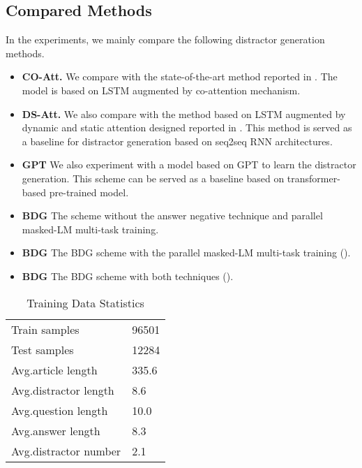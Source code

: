 \documentclass[11pt,a4paper]{article}
\begin{document}
\subsection{Compared Methods}
In the experiments, we mainly compare the following distractor generation methods. 
\begin{itemize}
     
    \item \textbf{CO-Att.} We compare with the state-of-the-art method reported in \cite{zhou2019coattention}. The model is based on LSTM augmented by co-attention mechanism. 
    \item \textbf{DS-Att.} We also compare with the method based on LSTM augmented by dynamic and static attention designed reported in \cite{gao2019generating}. This method is served as a baseline for distractor generation based on seq2seq RNN architectures. 
    \item \textbf{GPT} We also experiment with a model based on GPT \cite{radford2018improving} to learn the distractor generation. This scheme can be served as a baseline based on transformer-based pre-trained model. 
    \item \textbf{BDG} The scheme without the answer negative technique and parallel masked-LM multi-task training.
\item \textbf{BDG} The BDG scheme with the parallel masked-LM multi-task training ().
    \item \textbf{BDG} The BDG scheme with both techniques ().
\end{itemize}


\begin{table}
  \centering
  \begin{tabular}{ll}
    \midrule
    Train samples    &  96501     \\
    Test  samples     &  12284    \\
    \midrule
    Avg.article length  &  335.6     \\
    Avg.distractor length   &  8.6   \\
    Avg.question length &  10.0        \\
    Avg.answer length   & 8.3        \\
    \hline
    Avg.distractor number &  2.1 \\
    \hline
  \end{tabular}
  \caption{Training Data Statistics}
  \label{table:training data stat}
\end{table}
\end{document}
